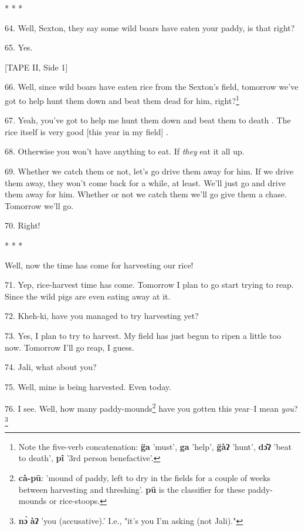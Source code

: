 \begin{center}
* * *
\end{center}

64. Well, Sexton, they say some wild boars have eaten your paddy, is that right?

65. Yes.

[TAPE II, Side 1]

66. Well, since wild boars have eaten rice from the Sexton's field, tomorrow we've
got to help hunt them down and beat them dead for him, right?\footnote{Note the five-verb concatenation: \textbf{g̈a} 'must', \textbf{ga} 'help', \textbf{g̈àʔ} 'hunt', \textbf{dɔ̂ʔ} 'beat to death', \textbf{pî} '3rd person benefactive'.}

67. Yeah, you've got to help me hunt them down and beat them to death . The rice
itself is very good [this year in my field] .

68. Otherwise you won't have anything to eat. If \textit{they} eat it all up.

69. Whether we catch them or not, let's go drive them away for him. If we drive
them away, they won't come back for a while, at least. We'll just go and drive
them away for him. Whether or not we catch them we'll go give them a chase. Tomorrow
we'll go.

70. Right!

\begin{center}
* * *
\end{center}

Well, now the time has come for harvesting our rice!

71. Yep, rice-harvest time has come. Tomorrow I plan to go start trying to reap.
Since the wild pigs are even eating away at it.

72. Kheh-ki, have you managed to try harvesting yet?

73. Yes, I plan to try to harvest. My field has just begun to ripen a little too
now. Tomorrow I'll go reap, I guess.

74. Jali, what about you?

75. Well, mine is being harvested. Even today.

76. I see. Well, how many paddy-mounds\footnote{\textbf{cà-pū}: 'mound of paddy, left to dry in the fields for a couple of weeks between harvesting and threshing'. \textbf{pū} is the classifier for these paddy-mounds or rice-stoops.} have you gotten this year--I mean \emph{you}?\footnote{\textbf{nɔ̀} \textbf{àʔ} 'you (accusative).' I.e., "it's you I'm asking (not Jali)."}

